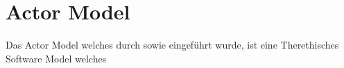 \chapter{Actor Model}
Das Actor Model welches durch \cite{hewitt1973session} sowie \cite{Agha1985Actors:Systems.} eingeführt wurde, ist eine Therethisches Software Model welches 